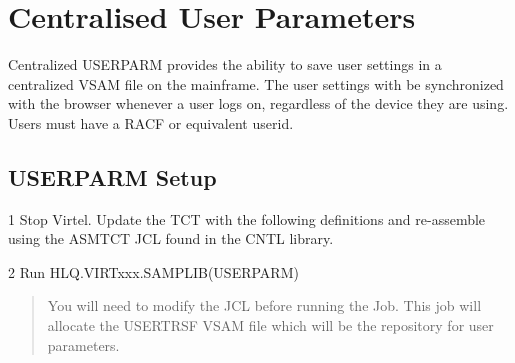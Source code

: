 \documentclass[letterpaper,10pt,english]{sphinxmanual}
\begin{document}
\chapter{Centralised User Parameters}
\label{\detokenize{Customization:centralised-user-parameters}}\label{\detokenize{Customization:index-100}}
Centralized USERPARM provides the ability to save user settings in a centralized VSAM file on the mainframe. The user settings with be synchronized with the browser whenever a user logs on, regardless of the device they are using. Users must have a RACF or equivalent userid.


\section{USERPARM Setup}
\label{\detokenize{Customization:userparm-setup}}
1   Stop Virtel. Update the TCT with the following definitions and re-assemble using the ASMTCT JCL found in the CNTL library.
\begin{quote}

\begin{sphinxVerbatim}[commandchars=\\\{\}]
                                              
                                
            
\end{sphinxVerbatim}
\end{quote}

2   Run HLQ.VIRTxxx.SAMPLIB(USERPARM)
\begin{quote}

You will need to modify the JCL before running the Job. This job will allocate the USERTRSF VSAM file which will be the repository for user parameters.
\end{quote}
\end{document}

